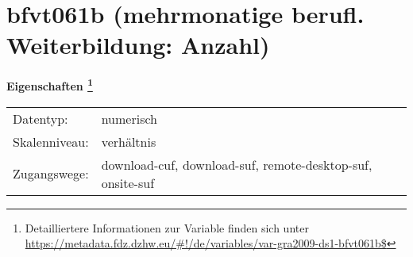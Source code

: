 
    \setcounter{footnote}{0}

    \vspace*{-1.8cm}
	\section{bfvt061b (mehrmonatige berufl. Weiterbildung: Anzahl)}
	\label{section:bfvt061b}



    \vspace*{0.5cm}
    \noindent\textbf{Eigenschaften
	\footnote{Detailliertere Informationen zur Variable finden sich unter
		\url{https://metadata.fdz.dzhw.eu/\#!/de/variables/var-gra2009-ds1-bfvt061b$}}}\\
	\begin{tabularx}{\hsize}{@{}lX}
	Datentyp: & numerisch \\
	Skalenniveau: & verhältnis \\
	Zugangswege: &
	  download-cuf, 
	  download-suf, 
	  remote-desktop-suf, 
	  onsite-suf
 \\
    \end{tabularx}



